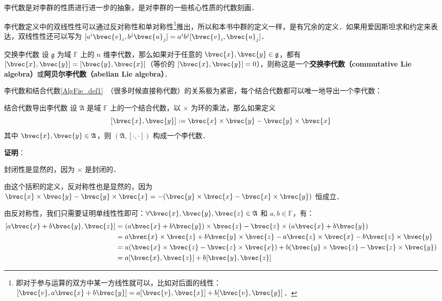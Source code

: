 李代数是对李群的性质进行进一步的抽象，是对李群的一些核心性质的代数刻画．

李代数定义中的双线性性可以通过反对称性和单对称性\footnote{即对于参与运算的双方中某一方线性就可以，比如对后面的线性：$[\bvec{v},a\bvec{x}+b\bvec{y}]=a[\bvec{v}, \bvec{x}]+b[\bvec{v}, \bvec{y}]$．}推出，所以和本书中群的定义一样，是有冗余的定义．如果用爱因斯坦求和约定来表达，双线性性还可以写为 $[a^i\bvec{v}_i, b^j\bvec{u}_j] = a^i b^j[\bvec{v}_i, \bvec{u}_j]$．

\begin{definition}{交换李代数}
设 $\mathfrak{g}$ 为域 $\mathbb{F}$ 上的 $n$ 维李代数，那么如果对于任意的 $\bvec{x},\bvec{y}\in\mathfrak{g}$，都有 $[\bvec{x}, \bvec{y}] = [\bvec{y}, \bvec{x}]$（等价的 $[\bvec{x}, \bvec{y}] = 0$），则称这是一个\textbf{交换李代数（commutative Lie algebra）}或\textbf{阿贝尔李代数（abelian Lie algebra）}．
\end{definition}

李代数和结合代数\autoref{AlgFie_def1}~（很多时候直接称代数）的关系极为紧密，每个结合代数都可以唯一地导出一个李代数：

\begin{theorem}{结合代数导出李代数}
设 $\mathfrak{A}$ 是域 $\mathbb{F}$ 上的一个结合代数，以 $\times$ 为环的乘法，那么如果定义
\[
[\bvec{x}, \bvec{y}] := \bvec{x}\times \bvec{y}-\bvec{y}\times \bvec{x}
\]
其中 $\bvec{x}, \bvec{y}\in\mathfrak{A}$，则 $(\mathfrak{A}, [\cdot, \cdot])$ 构成一个李代数．
\end{theorem}

\textbf{证明}：

封闭性是显然的，因为 $\times$ 是封闭的．

由这个括积的定义，反对称性也是显然的，因为 $\bvec{x}\times \bvec{y}-\bvec{y}\times \bvec{x}=-(\bvec{y}\times \bvec{x}-\bvec{x}\times \bvec{y})$ 恒成立．

由反对称性，我们只需要证明单线性性即可：$\forall \bvec{x}, \bvec{y}, \bvec{z}\in\frak{A}$ 和 $a, b\in\mathbb{F}$，有：
\begin{equation}
\begin{aligned}
{[a\bvec{x}+b\bvec{y}, \bvec{z}]}&=(a\bvec{x}+b\bvec{y})\times\bvec{z}-\bvec{z}\times(a\bvec{x}+b\bvec{y})\\
&=a\bvec{x}\times\bvec{z}+b\bvec{y}\times\bvec{z}-a\bvec{z}\times\bvec{x}-b\bvec{z}\times\bvec{y}\\
&=a(\bvec{x}\times\bvec{z}-\bvec{z}\times\bvec{x})+b(\bvec{y}\times\bvec{z}-\bvec{z}\times\bvec{y})\\
&=a[\bvec{x}, \bvec{z}]+b[\bvec{y}, \bvec{z}]
\end{aligned}
\end{equation}

